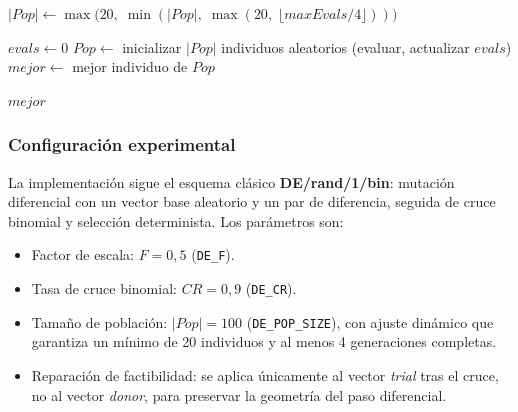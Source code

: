\begin{algorithm}[H]
\SetAlgoLined
{}

$|Pop| \leftarrow \max\bigl(20,\; \min(|Pop|,\; \max(20,\; \lfloor maxEvals/4 \rfloor))\bigr)$\;

$evals \leftarrow 0$\;
$Pop \leftarrow$ inicializar $|Pop|$ individuos aleatorios (evaluar, actualizar $evals$)\;
$mejor \leftarrow$ mejor individuo de $Pop$\;

\Return $mejor$\;
\caption{Evolución Diferencial (DE/rand/1/bin)}
\label{alg:de}
\end{algorithm}

\subsubsection{Configuración experimental}

La implementación sigue el esquema clásico \textbf{DE/rand/1/bin}: mutación diferencial con un vector base aleatorio y un par de diferencia, seguida de cruce binomial y selección determinista. Los parámetros son:

\begin{itemize}[noitemsep]
    \item Factor de escala: $F = 0{,}5$ (\texttt{DE\_F}).
    \item Tasa de cruce binomial: $CR = 0{,}9$ (\texttt{DE\_CR}).
    \item Tamaño de población: $|Pop| = 100$ (\texttt{DE\_POP\_SIZE}), con ajuste dinámico que garantiza un mínimo de 20 individuos y al menos 4 generaciones completas.
    \item Reparación de factibilidad: se aplica únicamente al vector \textit{trial} tras el cruce, no al vector \textit{donor}, para preservar la geometría del paso diferencial.
\end{itemize}

